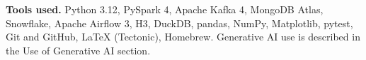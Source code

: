 \noindent\textbf{Tools used.} Python 3.12, PySpark 4, Apache Kafka 4, MongoDB Atlas, Snowflake, Apache Airflow 3, H3, DuckDB, pandas, NumPy, Matplotlib, pytest, Git and GitHub, LaTeX (Tectonic), Homebrew. Generative AI use is described in the Use of Generative AI section.
